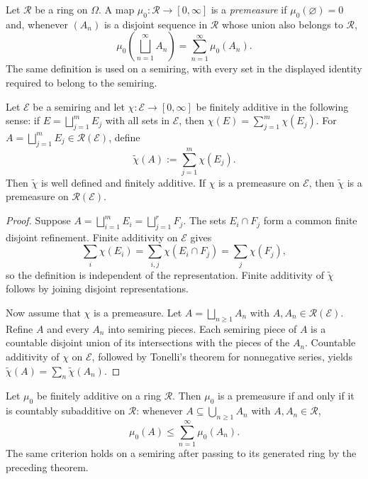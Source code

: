 \begin{de}[Premeasure]
Let $\mathcal R$ be a ring on $\Omega$. A map
$\mu_0:\mathcal R\to[0,\infty]$ is a \emph{premeasure} if
$\mu_0(\varnothing)=0$ and, whenever $(A_n)$ is a disjoint sequence in
$\mathcal R$ whose union also belongs to $\mathcal R$,
\[
\mu_0\!\left(\bigsqcup_{n=1}^{\infty}A_n\right)
 =\sum_{n=1}^{\infty}\mu_0(A_n).
\]
The same definition is used on a semiring, with every set in the displayed
identity required to belong to the semiring.
\end{de}

\begin{thm}
Let $\mathcal E$ be a semiring and let
$\chi:\mathcal E\to[0,\infty]$ be finitely additive in the following sense:
if $E=\bigsqcup_{j=1}^{m}E_j$ with all sets in $\mathcal E$, then
$\chi(E)=\sum_{j=1}^{m}\chi(E_j)$. For
$A=\bigsqcup_{j=1}^{m}E_j\in\mathcal R(\mathcal E)$, define
\[
\widetilde\chi(A):=\sum_{j=1}^{m}\chi(E_j).
\]
Then $\widetilde\chi$ is well defined and finitely additive. If $\chi$ is a
premeasure on $\mathcal E$, then $\widetilde\chi$ is a premeasure on
$\mathcal R(\mathcal E)$.
\end{thm}

\begin{proof}
Suppose
$A=\bigsqcup_{i=1}^{m}E_i=\bigsqcup_{j=1}^{r}F_j$. The sets
$E_i\cap F_j$ form a common finite disjoint refinement. Finite additivity on
$\mathcal E$ gives
\[
\sum_i\chi(E_i)
 =\sum_{i,j}\chi(E_i\cap F_j)
 =\sum_j\chi(F_j),
\]
so the definition is independent of the representation. Finite additivity of
$\widetilde\chi$ follows by joining disjoint representations.

Now assume that $\chi$ is a premeasure. Let
$A=\bigsqcup_{n\ge1}A_n$ with $A,A_n\in\mathcal R(\mathcal E)$. Refine $A$
and every $A_n$ into semiring pieces. Each semiring piece of $A$ is a
countable disjoint union of its intersections with the pieces of the $A_n$.
Countable additivity of $\chi$ on $\mathcal E$, followed by Tonelli's theorem
for nonnegative series, yields
$\widetilde\chi(A)=\sum_n\widetilde\chi(A_n)$.
\end{proof}

\begin{prop}
Let $\mu_0$ be finitely additive on a ring $\mathcal R$. Then $\mu_0$ is a
premeasure if and only if it is countably subadditive on $\mathcal R$:
whenever $A\subseteq\bigcup_{n\ge1}A_n$ with $A,A_n\in\mathcal R$,
\[
\mu_0(A)\leq\sum_{n=1}^{\infty}\mu_0(A_n).
\]
The same criterion holds on a semiring after passing to its generated ring by
the preceding theorem.
\end{prop}

